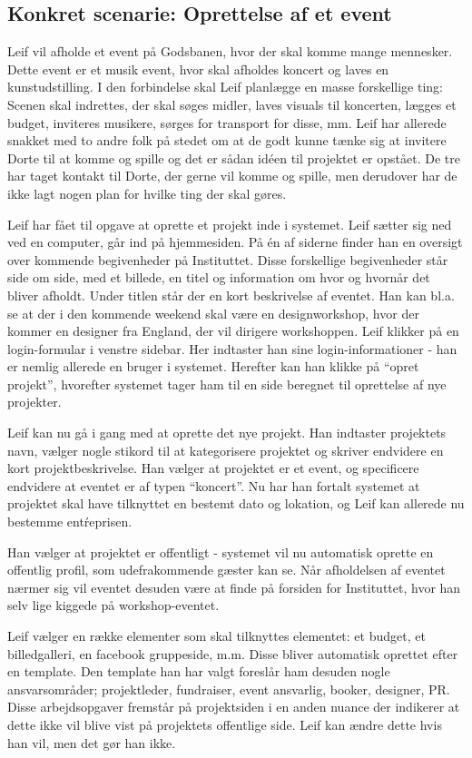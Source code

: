 \subsection{Konkret scenarie: Oprettelse af et event}
Leif vil afholde et event på Godsbanen, hvor der skal komme mange mennesker. Dette event er et musik event, hvor skal afholdes koncert og laves en kunstudstilling. I den forbindelse skal Leif planlægge en masse forskellige ting: Scenen skal indrettes, der skal søges midler, laves visuals til koncerten, lægges et budget, inviteres musikere, sørges for transport for disse, mm.
Leif har allerede snakket med to andre folk på stedet om at de godt kunne tænke sig at invitere Dorte til at komme og spille og det er sådan idéen til projektet er opstået. De tre har taget kontakt til Dorte, der gerne vil komme og spille, men derudover har de ikke lagt nogen plan for hvilke ting der skal gøres.

Leif har fået til opgave at oprette et projekt inde i systemet. Leif sætter sig ned ved en computer, går ind på hjemmesiden. På én af siderne finder han en oversigt over kommende begivenheder på Instituttet. Disse forskellige begivenheder står side om side, med et billede, en titel og information om hvor og hvornår det bliver afholdt. Under titlen står der en kort beskrivelse af eventet. Han kan bl.a. se at der i den kommende weekend skal være en designworkshop, hvor der kommer en designer fra England, der vil dirigere workshoppen. 
Leif klikker på en login-formular i venstre sidebar. Her indtaster han sine login-informationer - han er nemlig allerede en bruger i systemet. Herefter kan han klikke på “opret projekt”, hvorefter systemet tager ham til en side beregnet til oprettelse af nye projekter. 

Leif kan nu gå i gang med at oprette det nye projekt. Han indtaster projektets navn, vælger nogle stikord til at kategorisere projektet og skriver endvidere en kort projektbeskrivelse.
Han vælger at projektet er et event, og specificere endvidere at eventet er af typen “koncert”. Nu har han fortalt systemet at projektet skal have tilknyttet en bestemt dato og lokation, og Leif kan allerede nu bestemme entŕeprisen. 

Han vælger at projektet er offentligt - systemet vil nu automatisk oprette en offentlig profil, som udefrakommende gæster kan se. Når afholdelsen af eventet nærmer sig vil eventet desuden være at finde på forsiden for Instituttet, hvor han selv lige kiggede på workshop-eventet.

Leif vælger en række elementer som skal tilknyttes elementet: et budget, et billedgalleri, en facebook gruppeside, m.m. Disse bliver automatisk oprettet efter en template.
Den template han har valgt foreslår ham desuden nogle ansvarsområder; projektleder, fundraiser, event ansvarlig, booker, designer, PR. Disse arbejdsopgaver fremstår på projektsiden i en anden nuance der indikerer at dette ikke vil blive vist på projektets offentlige side. Leif kan ændre dette hvis han vil, men det gør han ikke. 

